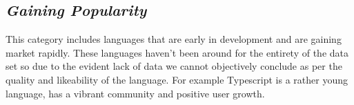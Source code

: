 \documentclass[conference]{IEEEtran}
\begin{document}
\subsection{\textit{Gaining Popularity}}
This category includes languages that are early in development and are gaining market rapidly.
These languages haven't been around for the entirety of the data set so due to the evident lack of data we cannot objectively conclude as per the quality and likeability of the language. For example Typescript is a rather young language, has a vibrant community and positive user growth.

\end{document}
